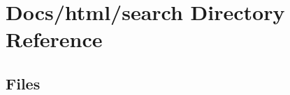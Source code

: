 \section{Docs/html/search Directory Reference}
\label{dir_d2036d4133112b47e74f15e4042a2b25}
\subsection*{Files}
\begin{DoxyCompactItemize}
\end{DoxyCompactItemize}
